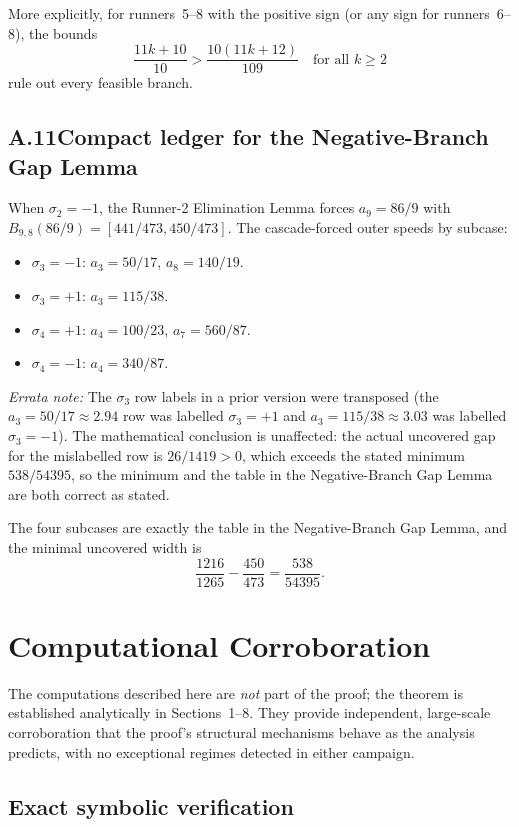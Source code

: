 \documentclass[12pt,a4paper]{amsart}
\theoremstyle{definition}
\theoremstyle{remark}
\begin{document}
More explicitly, for runners~5--8 with the positive sign (or any sign for runners~6--8),
the bounds
\[
  \frac{11k+10}{10} > \frac{10(11k+12)}{109}\quad\text{for all }k\ge 2
\]
rule out every feasible branch.

\subsection*{A.11\quad Compact ledger for the Negative-Branch Gap Lemma}

When $\sigma_2=-1$, the Runner-2 Elimination Lemma forces $a_9=86/9$ with
$B_{9,8}(86/9)=[441/473,450/473]$. The cascade-forced outer speeds by subcase:

\begin{itemize}
  \item $\sigma_3=-1$: $a_3=50/17$, $a_8=140/19$.
  \item $\sigma_3=+1$: $a_3=115/38$.
  \item $\sigma_4=+1$: $a_4=100/23$, $a_7=560/87$.
  \item $\sigma_4=-1$: $a_4=340/87$.
\end{itemize}

\noindent\emph{Errata note:} The $\sigma_3$ row labels in a prior version were transposed
(the $a_3=50/17\approx 2.94$ row was labelled $\sigma_3=+1$ and $a_3=115/38\approx 3.03$
was labelled $\sigma_3=-1$). The mathematical conclusion is unaffected: the actual
uncovered gap for the mislabelled row is $26/1419>0$, which exceeds the stated minimum
$538/54395$, so the minimum and the table in the Negative-Branch Gap Lemma are both
correct as stated.

The four subcases are exactly the table in the Negative-Branch Gap Lemma, and the
minimal uncovered width is
\[
  \frac{1216}{1265} - \frac{450}{473} = \frac{538}{54395}.
\]

\section{Computational Corroboration}

The computations described here are \emph{not} part of the proof; the theorem is
established analytically in Sections~1--8.  They provide independent, large-scale
corroboration that the proof's structural mechanisms behave as the analysis predicts,
with no exceptional regimes detected in either campaign.

\subsection*{Exact symbolic verification}
\end{document}
